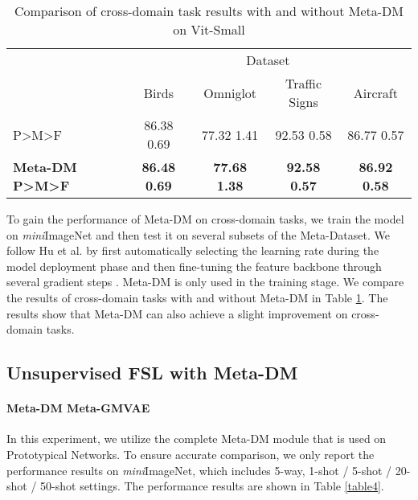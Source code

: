 \documentclass{article}
\begin{document}
\begin{table}
	\caption{Comparison of cross-domain task results with and without Meta-DM on Vit-Small}
	\centering
	\begin{tabular}{lcccc}
		\toprule
		& \multicolumn{4}{c}{Dataset} \\
		& Birds     & Omniglot & Traffic Signs & Aircraft\\
		\midrule
		P>M>F \cite{i7}  & 86.38  0.69  & 77.32  1.41  & 92.53  0.58 & 86.77  0.57 \\
		\textbf{Meta-DM  P>M>F}  & \textbf{86.48  0.69}  &  \textbf{ 77.68  1.38 } & \textbf{ 92.58  0.57 } & \textbf{ 86.92  0.58 } \\
		\bottomrule
	\end{tabular}
	\label{table3}
\end{table}


To gain the performance of Meta-DM on cross-domain tasks, we train the model on \textit{mini}ImageNet and then test it on several subsets of the Meta-Dataset. We follow Hu et al. by first automatically selecting the learning rate during the model deployment phase and then fine-tuning the feature backbone through several gradient steps \cite{i7}. Meta-DM is only used in the training stage. We compare the results of cross-domain tasks with and without Meta-DM in Table \ref{table3}. The results show that Meta-DM can also achieve a slight improvement on cross-domain tasks. 


\subsection{Unsupervised FSL with Meta-DM}


\paragraph{Meta-DM  Meta-GMVAE} In this experiment, we utilize the complete Meta-DM module that is used on Prototypical Networks. To ensure accurate comparison, we only report the performance results on \textit{mini}ImageNet, which includes 5-way, 1-shot / 5-shot / 20-shot / 50-shot settings. The performance results are shown in Table \ref{table4}.
\end{document}
